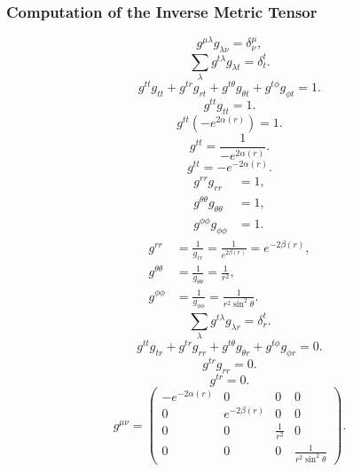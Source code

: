 \documentclass[11pt, a4paper]{report}
\begin{document}
\subsubsection{Computation of the Inverse Metric Tensor}
\begin{equation}
g^{\mu\lambda} g_{\lambda\nu} = \delta^\mu_\nu,
\end{equation}
\begin{equation}
\sum_{\lambda} g^{t\lambda} g_{\lambda t} = \delta^t_t.
\end{equation}
\begin{equation}
g^{tt} g_{tt} + g^{tr} g_{rt} + g^{t\theta} g_{\theta t} + g^{t\phi} g_{\phi t} = 1.
\end{equation}
\begin{equation}
g^{tt} g_{tt} = 1.
\end{equation}
\begin{equation}
g^{tt} \left( -e^{2\alpha(r)} \right) = 1.
\end{equation}
\begin{equation}
g^{tt} = \frac{1}{-e^{2\alpha(r)}}.
\end{equation}
\begin{equation}
g^{tt} = -e^{-2\alpha(r)}.
\end{equation}
\begin{align}
g^{rr} g_{rr} &= 1, \\
g^{\theta\theta} g_{\theta\theta} &= 1, \\
g^{\phi\phi} g_{\phi\phi} &= 1.
\end{align}
\begin{align}
g^{rr} &= \frac{1}{g_{rr}} = \frac{1}{e^{2\beta(r)}} = e^{-2\beta(r)}, \\
g^{\theta\theta} &= \frac{1}{g_{\theta\theta}} = \frac{1}{r^2}, \\
g^{\phi\phi} &= \frac{1}{g_{\phi\phi}} = \frac{1}{r^2 \sin^2\theta}.
\end{align}
\begin{equation}
\sum_{\lambda} g^{t\lambda} g_{\lambda r} = \delta^t_r.
\end{equation}
\begin{equation}
g^{tt} g_{tr} + g^{tr} g_{rr} + g^{t\theta} g_{\theta r} + g^{t\phi} g_{\phi r} = 0.
\end{equation}
\begin{equation}
g^{tr} g_{rr} = 0.
\end{equation}
\begin{equation}
g^{tr} = 0.
\end{equation}
\begin{equation}
g^{\mu\nu} = \begin{pmatrix}
-e^{-2\alpha(r)} & 0 & 0 & 0 \\
0 & e^{-2\beta(r)} & 0 & 0 \\
0 & 0 & \frac{1}{r^2} & 0 \\
0 & 0 & 0 & \frac{1}{r^2 \sin^2\theta}
\end{pmatrix}.
\end{equation}
\end{document}
